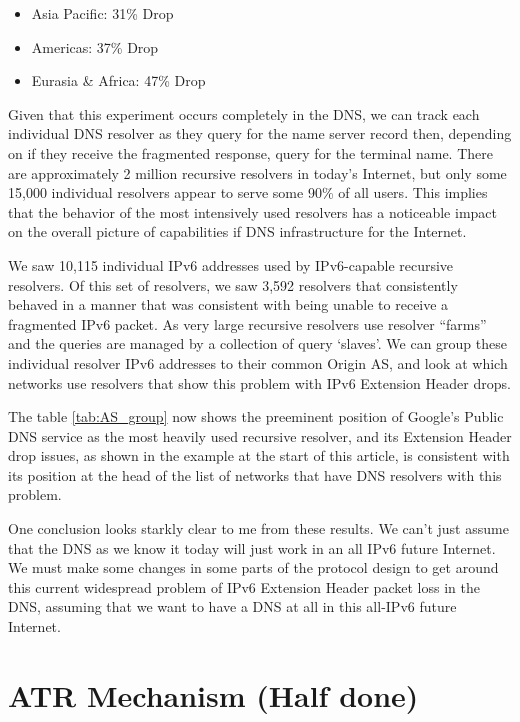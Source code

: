\begin{itemize}
  \item Asia Pacific: 31\% Drop
  \item Americas: 37\% Drop
  \item Eurasia \& Africa: 47\% Drop
\end{itemize}

Given that this experiment occurs completely in the DNS, we can 
track each individual DNS resolver as they query for the name 
server record then, depending on if they receive the fragmented 
response, query for the terminal name. There are approximately 
2 million recursive resolvers in today’s Internet, but only 
some 15,000 individual resolvers appear to serve some 90\% of 
all users. This implies that the behavior of the most 
intensively used resolvers has a noticeable impact on the 
overall picture of capabilities if DNS infrastructure for the Internet.

We saw 10,115 individual IPv6 addresses used by IPv6-capable 
recursive resolvers. Of this set of resolvers, we saw 3,592 
resolvers that consistently behaved in a manner that was consistent 
with being unable to receive a fragmented IPv6 packet. As very 
large recursive resolvers use resolver “farms” and the queries 
are managed by a collection of query ‘slaves’. We can group these 
individual resolver IPv6 addresses to their common Origin AS, 
and look at which networks use resolvers that show this problem 
with IPv6 Extension Header drops.

The table \ref{tab:AS_group} now shows the preeminent position 
of Google’s Public DNS service as the most heavily used recursive 
resolver, and its Extension Header drop issues, as shown in 
the example at the start of this article, is consistent with 
its position at the head of the list of networks that have DNS 
resolvers with this problem.

One conclusion looks starkly clear to me from these results. 
We can’t just assume that the DNS as we know it today will just 
work in an all IPv6 future Internet. We must make some changes 
in some parts of the protocol design to get around this current 
widespread problem of IPv6 Extension Header packet loss in the 
DNS, assuming that we want to have a DNS at all in this all-IPv6 
future Internet.

\section{ATR Mechanism (Half done)}

